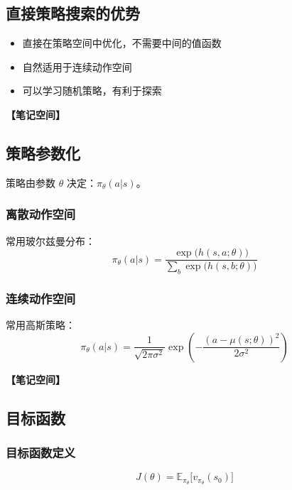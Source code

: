 \documentclass[12pt,a4paper]{article}
\newcommand{\notespace}[1][3cm]{%
  \vspace{#1}%
  \noindent\textbf{【笔记空间】}%
  \vspace{#1}%
}
\newcommand{\E}{\mathbb{E}}
\newcommand{\1}{\mathbf{1}}
\begin{document}
\subsection{直接策略搜索的优势}

\begin{itemize}[leftmargin=2em]
  \item 直接在策略空间中优化，不需要中间的值函数
  \item 自然适用于连续动作空间
  \item 可以学习随机策略，有利于探索
\end{itemize}

\notespace[2cm]

\subsection{策略参数化}

策略由参数 $\theta$ 决定：$\pi_\theta(a|s)$。

\subsubsection*{离散动作空间}

常用玻尔兹曼分布：
\begin{equation}
\pi_\theta(a|s)=\frac{\exp\bigl(h(s,a;\theta)\bigr)}{\sum_{b}\exp\bigl(h(s,b;\theta)\bigr)}
\end{equation}

\subsubsection*{连续动作空间}

常用高斯策略：
\begin{equation}
\pi_\theta(a|s)=\frac{1}{\sqrt{2\pi\sigma^2}}\exp\left(-\frac{(a-\mu(s;\theta))^2}{2\sigma^2}\right)
\end{equation}

\notespace[2cm]

\subsection{目标函数}

\subsubsection*{目标函数定义}

\begin{equation}
J(\theta)=\E_{\pi_\theta}\bigl[v_{\pi_\theta}(s_0)\bigr]
\end{equation}
\end{document}
